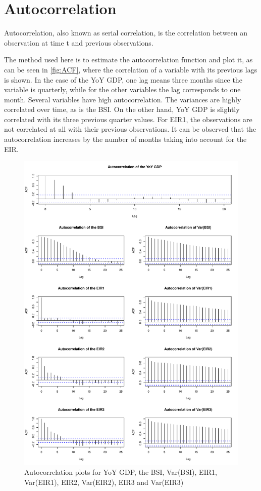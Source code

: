 \documentclass[12pt,a4paper,oneside]{book}
\begin{document}
\section{Autocorrelation}

Autocorrelation, also known as serial correlation, is the correlation between an observation at time t and previous observations.

The method used here is to estimate the autocorrelation function and plot it, as can be seen in \autoref{fig:ACF}, where the correlation of a variable with its previous lags is shown. In the case of the YoY GDP, one lag means three months since the variable is quarterly, while for the other variables the lag corresponds to one month.
Several variables have high autocorrelation. The variances are highly correlated over time, as is the BSI. 
On the other hand, YoY GDP is slightly correlated with its three previous quarter values. 
For EIR1, the observations are not correlated at all with their previous observations. It can be observed that the autocorrelation increases by the number of months taking into account for the EIR.


\begin{figure}[!htbp]
    \centering
    \captionsetup{justification=centering}
    \includegraphics[scale=0.75]{Graphs/ACF.pdf}
    \caption{Autocorrelation plots for YoY GDP, the BSI, Var(BSI), EIR1, Var(EIR1), EIR2, Var(EIR2), EIR3 and Var(EIR3)}
    \label{fig:ACF}
\end{figure}
\end{document}
